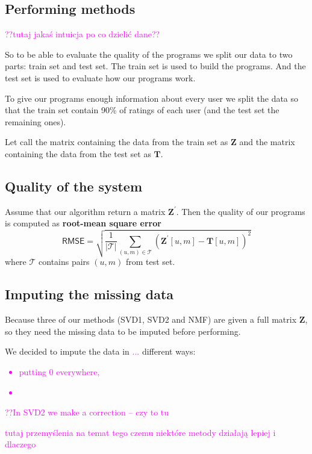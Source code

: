 \documentclass[11pt]{amsart}
\newcommand{\tami}[1]{{\textcolor{magenta}{#1}}}
\begin{document}
\subsection*{Performing methods}

\tami{??tutaj jakaś intuicja po co dzielić dane??}

So to be able to evaluate the quality of the programs we split our data to two parts: train set and test set.
The train set is used to build the programs.
And the test set is used to evaluate how our programs work.


To give our programs enough information about every user we split the data so that the train set contain 90\% of ratings of each user (and the test set the remaining ones).


Let call the matrix containing the data from the train set as $\boldsymbol{Z}$ and the matrix containing the data from the test set as $\boldsymbol{T}$.


\subsection*{Quality of the system}

Assume that our algorithm return a matrix $\boldsymbol{Z}^{'}$.
Then the quality of our programs is computed as \textbf{root-mean square error}
\[\textsf{RMSE} =
\sqrt{\frac{1}{|\mathcal{T}|} \sum_{(u,m) \in \mathcal{T}} \left(\boldsymbol{Z}^{'}[u,m] - \boldsymbol{T}[u,m] \right)^2}\]
where $\mathcal{T}$ contains pairs $(u,m)$ from test set.


\subsection*{Imputing the missing data}

Because three of our methods (SVD1, SVD2 and NMF) are given a full matrix $\boldsymbol{Z}$, so they need the missing data to be imputed before performing.

We decided to impute the data in \tami{...} different ways:
\tami{
\begin{itemize}
    \item putting 0 everywhere,
    \item
\end{itemize}
}

\tami{??In SVD2 we make a correction -- czy to tu}

\tami{tutaj przemyślenia na temat tego czemu niektóre metody działają lepiej i dlaczego}
\end{document}
